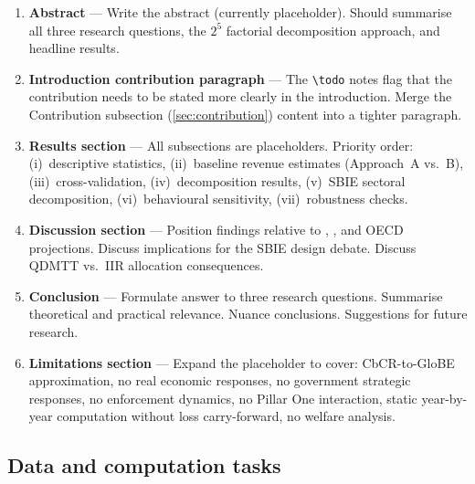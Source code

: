 \documentclass[11pt,a4paper]{article}
\begin{document}
\begin{enumerate}
\item \textbf{Abstract} --- Write the abstract (currently placeholder). Should summarise all three research questions, the $2^5$ factorial decomposition approach, and headline results.
\item \textbf{Introduction contribution paragraph} --- The \texttt{\textbackslash todo} notes flag that the contribution needs to be stated more clearly in the introduction. Merge the Contribution subsection (\ref{sec:contribution}) content into a tighter paragraph.
\item \textbf{Results section} --- All subsections are placeholders. Priority order: (i)~descriptive statistics, (ii)~baseline revenue estimates (Approach~A vs.~B), (iii)~cross-validation, (iv)~decomposition results, (v)~SBIE sectoral decomposition, (vi)~behavioural sensitivity, (vii)~robustness checks.
\item \textbf{Discussion section} --- Position findings relative to \citet{barake2022}, \citet{hugger2026}, and OECD projections. Discuss implications for the SBIE design debate. Discuss QDMTT vs.\ IIR allocation consequences.
\item \textbf{Conclusion} --- Formulate answer to three research questions. Summarise theoretical and practical relevance. Nuance conclusions. Suggestions for future research.
\item \textbf{Limitations section} --- Expand the placeholder to cover: CbCR-to-GloBE approximation, no real economic responses, no government strategic responses, no enforcement dynamics, no Pillar One interaction, static year-by-year computation without loss carry-forward, no welfare analysis.
\end{enumerate}

\subsection{Data and computation tasks}
\end{document}

